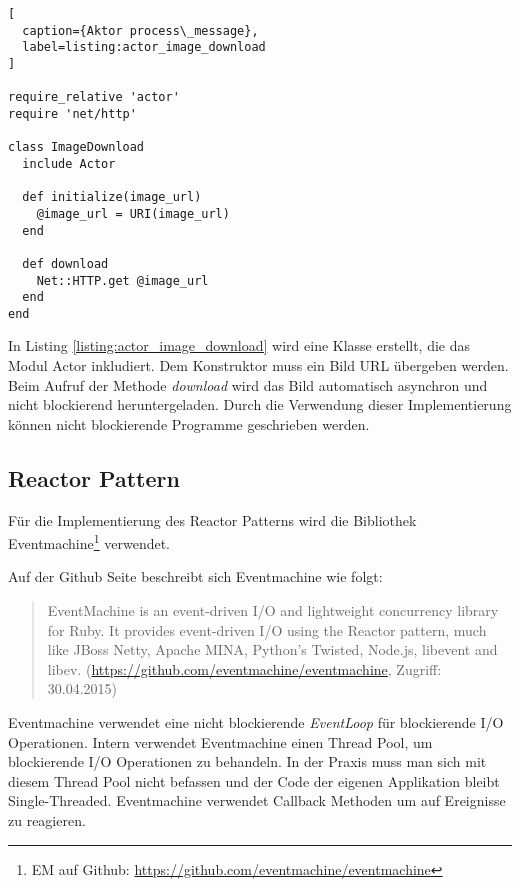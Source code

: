 \begin{lstlisting}[
  caption={Aktor process\_message},
  label=listing:actor_image_download
]

require_relative 'actor'
require 'net/http'

class ImageDownload
  include Actor

  def initialize(image_url)
    @image_url = URI(image_url)
  end

  def download
    Net::HTTP.get @image_url
  end
end
\end{lstlisting}

In Listing \ref{listing:actor_image_download} wird eine Klasse erstellt, die das Modul Actor inkludiert. Dem Konstruktor muss ein Bild URL übergeben werden. Beim Aufruf der Methode \emph{download} wird das Bild automatisch asynchron und nicht blockierend heruntergeladen. Durch die Verwendung dieser Implementierung können nicht blockierende Programme geschrieben werden. 

\subsection{Reactor Pattern}
Für die Implementierung des Reactor Patterns wird die Bibliothek Eventmachine\footnote{EM auf Github: \url{https://github.com/eventmachine/eventmachine}} verwendet. 

Auf der Github Seite beschreibt sich Eventmachine wie folgt: 

\begin{quote}
  EventMachine is an event-driven I/O and lightweight concurrency library for Ruby. It provides event-driven I/O using the Reactor pattern, much like JBoss Netty, Apache MINA, Python's Twisted, Node.js, libevent and libev. (\url{https://github.com/eventmachine/eventmachine}, Zugriff: 30.04.2015)
\end{quote}

Eventmachine verwendet eine nicht blockierende \emph{EventLoop} für blockierende I/O Operationen. Intern verwendet Eventmachine einen Thread Pool, um blockierende I/O Operationen zu behandeln. In der Praxis muss man sich mit diesem Thread Pool nicht befassen und der Code der eigenen Applikation bleibt Single-Threaded. Eventmachine verwendet Callback Methoden um auf Ereignisse zu reagieren. 

